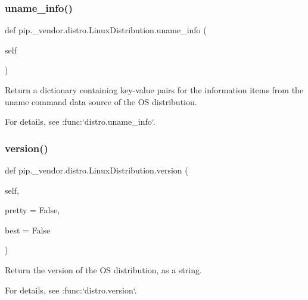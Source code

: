 \subsubsection{\texorpdfstring{uname\+\_\+info()}{uname\_info()}}
{\footnotesize\ttfamily def pip.\+\_\+vendor.\+distro.\+Linux\+Distribution.\+uname\+\_\+info (\begin{DoxyParamCaption}\item[{}]{self }\end{DoxyParamCaption})}

\begin{DoxyVerb}Return a dictionary containing key-value pairs for the information
items from the uname command data source of the OS distribution.

For details, see :func:`distro.uname_info`.
\end{DoxyVerb}
 \mbox{\label{classpip_1_1__vendor_1_1distro_1_1LinuxDistribution_a0c37e11aca02766e25025a395c09dd8b}} 
\subsubsection{\texorpdfstring{version()}{version()}}
{\footnotesize\ttfamily def pip.\+\_\+vendor.\+distro.\+Linux\+Distribution.\+version (\begin{DoxyParamCaption}\item[{}]{self,  }\item[{}]{pretty = {\ttfamily False},  }\item[{}]{best = {\ttfamily False} }\end{DoxyParamCaption})}

\begin{DoxyVerb}Return the version of the OS distribution, as a string.

For details, see :func:`distro.version`.
\end{DoxyVerb}
 \mbox{\label{classpip_1_1__vendor_1_1distro_1_1LinuxDistribution_a75cf0bb28d95514dc96425ef8c192660}} 

